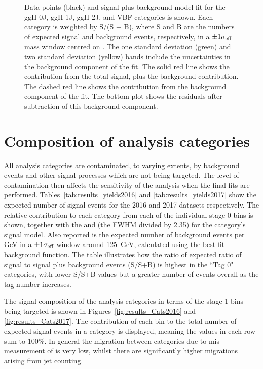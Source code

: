 \begin{figure}[hptb]
  \caption[Signal plus background fits to data, 
           summed over analysis categories targeting different bins.]
  {
    Data points (black) and signal plus background model fit 
    for the ggH 0J, ggH 1J, ggH 2J, and VBF categories is shown. 
    Each category is weighted by S/(S + B), 
    where S and B are the numbers of expected signal and background events, respectively, 
    in a $\pm 1 \sigma_{\text{eff}}$ mass window centred on \mH. 
    The one standard deviation (green) and two standard deviation (yellow) bands 
    include the uncertainties in the background component of the fit. 
    The solid red line shows the contribution from the total signal, plus the background contribution. 
    The dashed red line shows the contribution from the background component of the fit. 
    The bottom plot shows the residuals after subtraction of this background component.
  }
  \label{fig:results_MassPlots}
\end{figure}

\section{Composition of analysis categories}

All analysis categories are contaminated, to varying extents, 
by background events and other signal processes which are not being targeted.
The level of contamination then affects the sensitivity of the analysis 
when the final fits are performed.
Tables~\ref{tab:results_yields2016} and \ref{tab:results_yields2017} 
show the expected number of signal events for the 2016 and 2017 datasets respectively.
The relative contribution to each category from each of the individual stage 0 bins is shown, 
together with the \seff and \shm (the FWHM divided by 2.35) for the category's signal model.
Also reported is the expected number of background events per GeV in a $\pm1\sigma_{\text{eff}}$ window 
around \SI{125}{GeV}, calculated using the best-fit background function.
The table illustrates how the ratio of expected ratio of signal 
to signal plus background events (S/S+B) is highest in the ``Tag 0" categories, 
with lower S/S+B values but a greater number of events overall as the tag number increases.

The signal composition of the analysis categories in terms of the stage 1 bins being targeted
is shown in Figures~\ref{fig:results_Cats2016} and \ref{fig:results_Cats2017}.
The contribution of each bin to the total number of expected signal events in a category is displayed, 
meaning the values in each row sum to 100\%.
In general the migration between categories due to mis-measurement of \ptgg is very low, 
whilst there are significantly higher migrations arising from jet counting.

